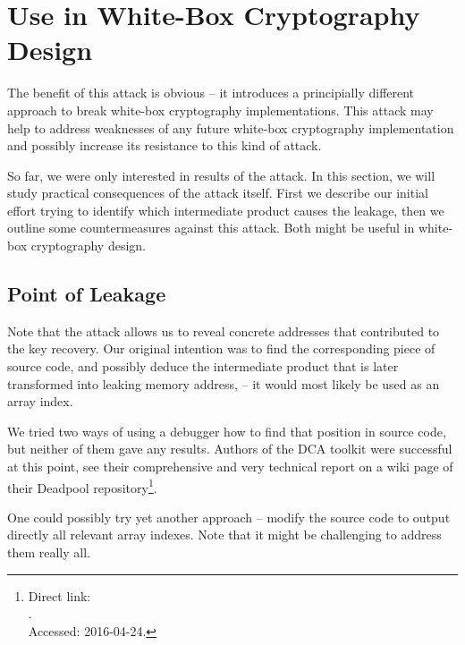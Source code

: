 \section{Use in White-Box Cryptography Design}
\label{sec:useindesign}

The benefit of this attack is obvious -- it introduces a principially different approach to break white-box cryptography implementations. This attack may help to address weaknesses of any future white-box cryptography implementation and possibly increase its resistance to this kind of attack.

So far, we were only interested in results of the attack. In this section, we will study practical consequences of the attack itself. First we describe our initial effort trying to identify which intermediate product causes the leakage, then we outline some countermeasures against this attack. Both might be useful in white-box cryptography design.



\subsection{Point of Leakage}
\label{sec:leakpoint}

Note that the attack allows us to reveal concrete addresses that contributed to the key recovery. Our original intention was to find the corresponding piece of source code, and possibly deduce the intermediate product that is later transformed into leaking memory address, -- it would most likely be used as an array index.

We tried two ways of using a debugger how to find that position in source code, but neither of them gave any results. Authors of the DCA toolkit \cite{bos2016tools} were successful at this point, see their comprehensive and very technical report on a wiki page of their Deadpool repository\footnote{Direct link:\\.\\Accessed: 2016-04-24.}.

One could possibly try yet another approach -- modify the source code to output directly all relevant array indexes. Note that it might be challenging to address them really all.

